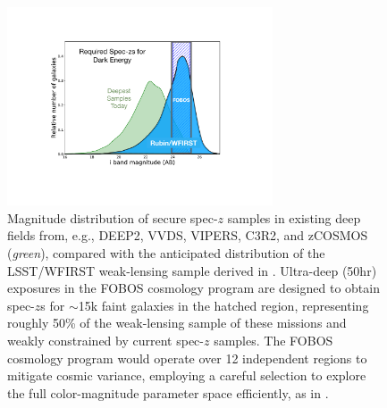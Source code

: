 \documentclass[11pt,a4paper,twoside,onecolumn,openany,final,oldfontcommands]{memoir}
\begin{document}

\begin{figure}
\begin{center}
\includegraphics[width=0.7\textwidth]{figs/fobos_cosmology_v2.pdf}
\end{center}
\caption[Magnitude distribution of spec-$z$ samples]{Magnitude distribution of secure spec-$z$ samples in existing deep fields from, e.g., DEEP2, VVDS, VIPERS, C3R2, and zCOSMOS (\textit{green}), compared with the anticipated distribution of the LSST/WFIRST weak-lensing sample derived in \citet[][\textit{blue}]{hemmati18}. Ultra-deep (50hr) exposures in the FOBOS cosmology program are designed to obtain spec-$z$s for $\sim$15k faint galaxies in the hatched region, representing roughly 50\% of the weak-lensing sample of these missions and weakly constrained by current spec-$z$ samples. The FOBOS cosmology program would operate over 12 independent regions to mitigate cosmic variance, employing a careful selection to explore the full color-magnitude parameter space efficiently, as in \cite{masters15}. }
\label{fig:cosmos_magdist}
\end{figure}
\end{document}
